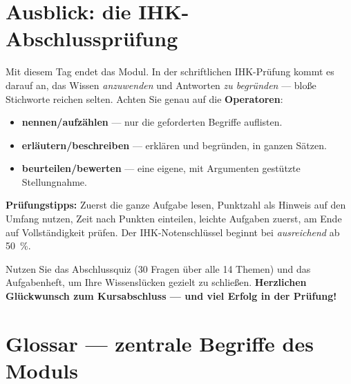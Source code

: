 \documentclass[11pt, a4paper]{article}
\begin{document}
\newpage

\section{Ausblick: die IHK-Abschlussprüfung}

Mit diesem Tag endet das Modul. In der schriftlichen IHK-Prüfung kommt es darauf an, das
Wissen \emph{anzuwenden} und Antworten \emph{zu begründen} --- bloße Stichworte reichen
selten. Achten Sie genau auf die \textbf{Operatoren}:

\begin{itemize}
  \item \textbf{nennen/aufzählen} --- nur die geforderten Begriffe auflisten.
  \item \textbf{erläutern/beschreiben} --- erklären und begründen, in ganzen Sätzen.
  \item \textbf{beurteilen/bewerten} --- eine eigene, mit Argumenten gestützte Stellungnahme.
\end{itemize}

\begin{eselsbruecke}
\textbf{Prüfungstipps:} Zuerst die ganze Aufgabe lesen, Punktzahl als Hinweis auf den
Umfang nutzen, Zeit nach Punkten einteilen, leichte Aufgaben zuerst, am Ende auf
Vollständigkeit prüfen. Der IHK-Notenschlüssel beginnt bei \emph{ausreichend} ab 50~\%.
\end{eselsbruecke}

Nutzen Sie das Abschlussquiz (30 Fragen über alle 14 Themen) und das Aufgabenheft, um
Ihre Wissenslücken gezielt zu schließen. \textbf{Herzlichen Glückwunsch zum Kursabschluss
--- und viel Erfolg in der Prüfung!}

\newpage

\section*{Glossar --- zentrale Begriffe des Moduls}



\end{document}
